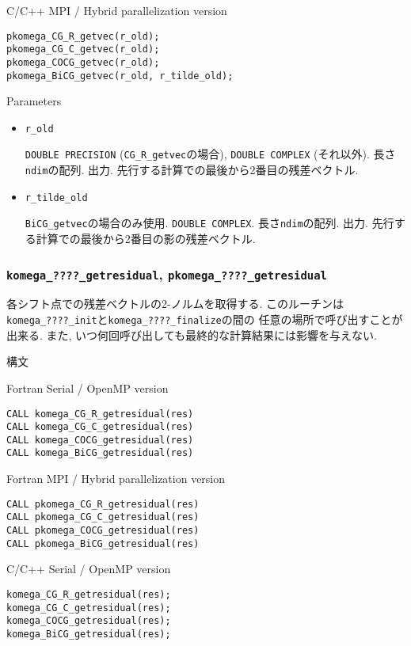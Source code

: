 \documentclass[12pt,titlepage]{article}
\begin{document}
\noindent C/C++ MPI / Hybrid parallelization version
\begin{verbatim}
pkomega_CG_R_getvec(r_old);
pkomega_CG_C_getvec(r_old);
pkomega_COCG_getvec(r_old);
pkomega_BiCG_getvec(r_old, r_tilde_old);
\end{verbatim}

\noindent Parameters

\begin{itemize}
  
\item \verb|r_old|

  \verb|DOUBLE PRECISION| (\verb|CG_R_getvec|の場合),
  \verb|DOUBLE COMPLEX| (それ以外).
  長さ\verb|ndim|の配列. 出力.
  先行する計算での最後から2番目の残差ベクトル.

\item \verb|r_tilde_old|

  \verb|BiCG_getvec|の場合のみ使用.
  \verb|DOUBLE COMPLEX|.
  長さ\verb|ndim|の配列. 出力.
  先行する計算での最後から2番目の影の残差ベクトル.

\end{itemize}

\subsubsection{\texttt{komega\_????\_getresidual}, \texttt{pkomega\_????\_getresidual}}

各シフト点での残差ベクトルの2-ノルムを取得する.
このルーチンは\verb|komega_????_init|と\verb|komega_????_finalize|の間の
任意の場所で呼び出すことが出来る.
また, いつ何回呼び出しても最終的な計算結果には影響を与えない.

\noindent 構文

\noindent Fortran Serial / OpenMP version
\begin{verbatim}
CALL komega_CG_R_getresidual(res)
CALL komega_CG_C_getresidual(res)
CALL komega_COCG_getresidual(res)
CALL komega_BiCG_getresidual(res)
\end{verbatim}

\noindent Fortran MPI / Hybrid parallelization version
\begin{verbatim}
CALL pkomega_CG_R_getresidual(res)
CALL pkomega_CG_C_getresidual(res)
CALL pkomega_COCG_getresidual(res)
CALL pkomega_BiCG_getresidual(res)
\end{verbatim}

\noindent C/C++ Serial / OpenMP version
\begin{verbatim}
komega_CG_R_getresidual(res);
komega_CG_C_getresidual(res);
komega_COCG_getresidual(res);
komega_BiCG_getresidual(res);
\end{verbatim}
\end{document}
